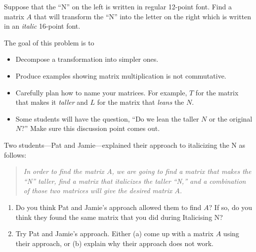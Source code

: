 \documentclass{workbook}
\begin{document}
\begin{iola}
\begin{slide}
\begin{minipage}{.5\textwidth}
Suppose that the ``N'' on the left is written in regular 12-point font.  Find a matrix $A$ that will transform
	the ``N'' into the letter on the right which is written in an \emph{italic} 16-point font.
\end{minipage}
	\begin{annotation}
		\begin{goals}

			The goal of this problem is to
			\begin{itemize}
				\item Decompose a transformation into simpler ones.
				\item Produce examples showing matrix multiplication is not commutative.
			\end{itemize}
		\end{goals}

		\begin{notes}
			\begin{itemize}
				\item Carefully plan how to name your matrices. For example, $T$ for
					the matrix that makes it \emph{taller} and $L$ for the matrix
					that \emph{leans} the $N$.
				\item Some students will have the question, ``Do we lean the taller $N$ or the original $N$?''
					Make sure this discussion point comes out.

			\end{itemize}
		\end{notes}
	\end{annotation}

Two students---Pat and Jamie---explained their approach to italicizing the N as follows:
\begin{quote}\itshape
	In order to find the matrix $A$, we are going to find a matrix that makes the ``N'' taller,
	find a matrix that italicizes the taller ``N,'' and a combination of those two matrices
	will give the desired matrix $A$.
\end{quote}

\begin{enumerate}
	\item Do you think Pat and Jamie's approach allowed them to find $A$?  If so, do
		you think they found the same matrix that you did during Italicising N?
	\item Try Pat and Jamie's approach.  Either (a) come up with a matrix $A$ using
		their approach, or (b) explain why their approach does not work.
\end{enumerate}

\end{slide}
\end{iola}
\end{document}
